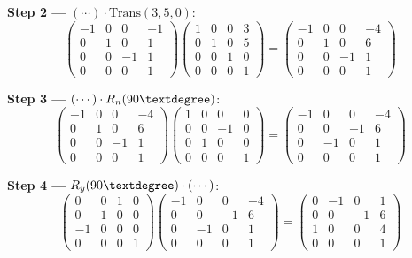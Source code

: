 \documentclass[12pt,a3paper]{article}
\begin{document}
\begin{enumerate}
\begin{tcolorbox}[enhanced,breakable,ansbox,colback=cB!4,colframe=cB,
  boxrule=0.8pt,arc=5pt,
  title={\textbf{Solution}},fonttitle=\bfseries\color{white},
  colbacktitle=cB]
\medskip
\textbf{Step 2 —} $(\cdots)\cdot\mathrm{Trans}(3,5,0)$:
\[
  \begin{pmatrix}-1&0&0&-1\\0&1&0&1\\0&0&{-1}&1\\0&0&0&1\end{pmatrix}
  \begin{pmatrix}1&0&0&3\\0&1&0&5\\0&0&1&0\\0&0&0&1\end{pmatrix}
  =
  \begin{pmatrix}-1&0&0&-4\\0&1&0&6\\0&0&{-1}&1\\0&0&0&1\end{pmatrix}
\]

\medskip
\textbf{Step 3 —} $(\cdots)\cdot R_n(90\textdegree)$:
\[
  \begin{pmatrix}-1&0&0&-4\\0&1&0&6\\0&0&{-1}&1\\0&0&0&1\end{pmatrix}
  \begin{pmatrix}1&0&0&0\\0&0&-1&0\\0&1&0&0\\0&0&0&1\end{pmatrix}
  =
  \begin{pmatrix}-1&0&0&-4\\0&0&-1&6\\0&-1&0&1\\0&0&0&1\end{pmatrix}
\]

\medskip
\textbf{Step 4 —} $R_y(90\textdegree)\cdot(\cdots)$:
\[
  \begin{pmatrix}0&0&1&0\\0&1&0&0\\-1&0&0&0\\0&0&0&1\end{pmatrix}
  \begin{pmatrix}-1&0&0&-4\\0&0&-1&6\\0&-1&0&1\\0&0&0&1\end{pmatrix}
  =
  \begin{pmatrix}0&-1&0&1\\0&0&-1&6\\1&0&0&4\\0&0&0&1\end{pmatrix}
\]


\end{tcolorbox}
\end{enumerate}
\end{document}
